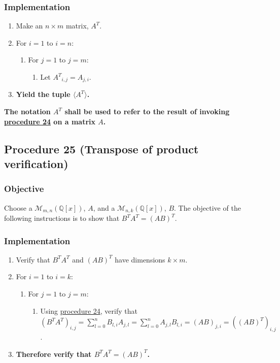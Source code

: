 \documentclass[twocolumn]{article}
\begin{document}
			\subsubsection{Implementation}
				\begin{enumerate}
					\item Make an $n\times m$ matrix, $A^T$.
					\item For $i=1$ to $i=n$:
					\begin{enumerate}
						\item For $j=1$ to $j=m$:
						\begin{enumerate}
							\item Let ${A^T}_{i,j}=A_{j,i}$.
						\end{enumerate}
					\end{enumerate}
					\item \textbf{Yield the tuple $\langle A^T\rangle$.}
				\end{enumerate}
			\textbf{The notation $A^T$ shall be used to refer to the result of invoking \hyperref[sec:procedure 24]{procedure 24} on a matrix $A$.}
		\subsection{Procedure 25 (Transpose of product verification)}\label{sec:procedure 25}
			\subsubsection{Objective}
				Choose a $\mathcal{M}_{m,n}(\mathbb{Q}[x])$, $A$, and a $\mathcal{M}_{n,k}(\mathbb{Q}[x])$, $B$. The objective of the following instructions is to show that $B^TA^T=(AB)^T$.
			\subsubsection{Implementation}
				\begin{enumerate}
					\item Verify that $B^TA^T$ and $(AB)^T$ have dimensions $k\times m$.
					\item For $i=1$ to $i=k$:
					\begin{enumerate}
						\item For $j=1$ to $j=m$:
						\begin{enumerate}
							\item Using \hyperref[sec:procedure 24]{procedure 24}, verify that $(B^TA^T)_{i,j}=\sum_{l=0}^n B_{l,i}A_{j,l}=\sum_{l=0}^n A_{j,l}B_{l,i}=(AB)_{j,i}=((AB)^T)_{i,j}$.
						\end{enumerate}
					\end{enumerate}
					\item \textbf{Therefore verify that $B^TA^T=(AB)^T$.}
				\end{enumerate}
\end{document}
